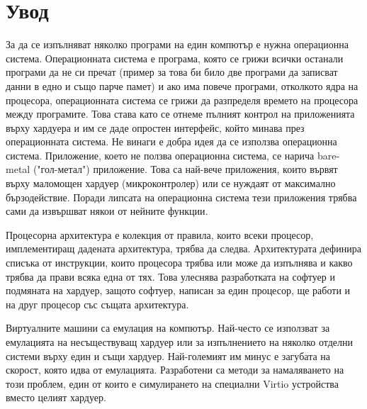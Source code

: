 \chapter*{Увод}



За да се изпълняват няколко програми на един компютър е нужна операционна система. Операционната система е програма, която се грижи всички останали програми да не си пречат (пример за това би било две програми да записват данни в едно и също парче памет) и ако има повече програми, отколкото ядра на процесора, операционната система се грижи да разпределя времето на процесора между програмите. Това става като се отнеме пълният контрол на приложенията върху хардуера и им се даде опростен интерфейс, който минава през операционната система.
Не винаги е добра идея да се използва операционна система. Приложение, което не ползва операционна система, се нарича bare-metal ("гол-метал") приложение. Това са най-вече приложения, които вървят върху маломощен хардуер (микроконтролер) или се нуждаят от максимално бързодействие. Поради липсата на операционна система тези приложения трябва сами да извършват някои от нейните функции.

Процесорна архитектура е колекция от правила, които всеки процесор, имплементиращ дадената архитектура, трябва да следва. Архитектурата дефинира списъка от инструкции, които процесора трябва или може да изпълнява и какво трябва да прави всяка една от тях. Това улеснява разработката на софтуер и подмяната на хардуер, защото софтуер, написан за един процесор, ще работи и на друг процесор със същата архитектура.

Виртуалните машини са емулация на компютър. Най-често се използват за емулацията на несъществуващ хардуер или за изпълнението на няколко отделни системи върху един и същи хардуер. Най-големият им минус е загубата на скорост, която идва от емулацията. Разработени са методи за намаляването на този проблем, един от които е симулирането на специални Virtio устройства вместо целият хардуер.


